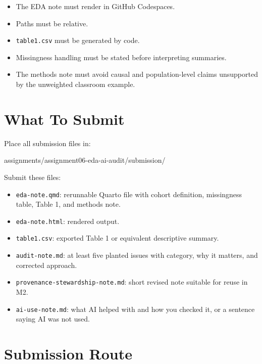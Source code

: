 \documentclass[
  letterpaper,
  DIV=11,
  numbers=noendperiod,
  oneside]{scrreprt}
\newenvironment{Shaded}{\begin{snugshade}}{\end{snugshade}}
\newcommand{\NormalTok}[1]{\textcolor[rgb]{0.00,0.23,0.31}{#1}}
\providecommand{\tightlist}{%
  \setlength{\itemsep}{0pt}\setlength{\parskip}{0pt}}
\begin{document}
\begin{itemize}
\tightlist
\item
  The EDA note must render in GitHub Codespaces.
\item
  Paths must be relative.
\item
  \texttt{table1.csv} must be generated by code.
\item
  Missingness handling must be stated before interpreting summaries.
\item
  The methods note must avoid causal and population-level claims
  unsupported by the unweighted classroom example.
\end{itemize}

\section{What To Submit}\label{what-to-submit-5}

Place all submission files in:

\begin{Shaded}
\begin{Highlighting}[numbers=left,,]
\NormalTok{assignments/assignment06{-}eda{-}ai{-}audit/submission/}
\end{Highlighting}
\end{Shaded}

Submit these files:

\begin{itemize}
\tightlist
\item
  \texttt{eda-note.qmd}: rerunnable Quarto file with cohort definition,
  missingness table, Table 1, and methods note.
\item
  \texttt{eda-note.html}: rendered output.
\item
  \texttt{table1.csv}: exported Table 1 or equivalent descriptive
  summary.
\item
  \texttt{audit-note.md}: at least five planted issues with category,
  why it matters, and corrected approach.
\item
  \texttt{provenance-stewardship-note.md}: short revised note suitable
  for reuse in M2.
\item
  \texttt{ai-use-note.md}: what AI helped with and how you checked it,
  or a sentence saying AI was not used.
\end{itemize}

\section{Submission Route}\label{submission-route-5}
\end{document}
